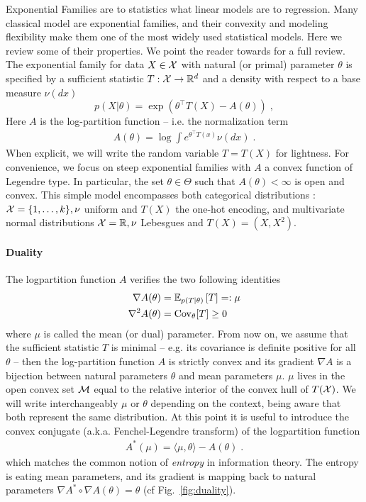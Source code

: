 \documentclass[twoside]{article}
\newcommand*{\expect}[2][]{\ensuremath{\mathbb{E}_{#1} \left[ #2 \right] }} %
\newcommand{\logpart}{A}
\newcommand{\conj}{\logpart^*}
\newcommand{\natp}{\theta}
\newcommand{\meanp}{\mu}
\begin{document}
Exponential Families are to statistics what linear models are to regression.
Many classical model are exponential families, and their convexity and modeling flexibility make them one of the most widely used statistical models. 
Here we review some of their properties. 
We point the reader towards \citet[Chapter 3]{wainwright2008graphical} for a full review.
The exponential family for data $X\in {\mathcal X}$ with natural (or primal) parameter $\natp$  is specified by a sufficient statistic $T: {\mathcal X} \rightarrow \mathbb{R}^d$ and a density with respect to a base measure $\nu(dx)$
\begin{equation}
	 p(X|\natp) = \exp( \natp^\top T(X) - \logpart(\natp)) \; ,
\end{equation}
Here $\logpart$ is the log-partition function -- i.e. the normalization term
\begin{align}
    \logpart(\natp) = \log \int e^{\natp^\top T(x)} \nu(dx) \; .
\end{align}
When explicit, we will write the random variable $T = T(X)$ for lightness.
For convenience, we focus on steep exponential families with $\logpart$ a convex function of Legendre type.
In particular, the set $\natp \in \Theta$ such that $\logpart(\natp) < \infty$ is open and convex.
This simple model encompasses both categorical distributions : ${\mathcal X} = \{1, \dots, k\}, \nu$ uniform and $T(X)$  the one-hot encoding, and multivariate normal distributions ${\mathcal X}=\mathbb{R}, \nu$ Lebesgues and $T(X)=(X, X^2)$. 


\paragraph{Duality}
The logpartition function $\logpart$ verifies the two following identities
\begin{align}
    \nabla\logpart(\natp) &=  \expect[p(T|\natp)]{T} =: \meanp \\
    \nabla^2 \logpart(\natp) &= \Cov_\natp[T] \geq 0
\end{align}
where $\meanp$ is called the mean (or dual) parameter.
From now on, we assume that the sufficient statistic $T$ is minimal 
-- e.g. its covariance is definite positive for all $\natp$ -- 
then the log-partition function $\logpart$ is strictly convex and its gradient $\nabla \logpart$ is a bijection between natural parameters $\natp$ and mean parameters $\mu$.
$\meanp$ lives in the open convex set ${\mathcal M}$ equal to the relative interior of the convex hull of $T({\mathcal X})$.
We will write interchangeably $\mu$ or  $\natp$ depending on the context, being aware that both represent the same distribution.
At this point it is useful to introduce the convex conjugate (a.k.a. Fenchel-Legendre transform) of the logpartition function
\begin{align}
	\conj(\mu) = \langle \mu, \natp \rangle - \logpart(\natp) \; .
\end{align}
which matches the common notion of \textit{entropy} in information theory.
The entropy is eating mean parameters, and its gradient is mapping back to natural parameters $\nabla\conj \circ \nabla\logpart(\natp) = \natp$ (cf Fig.~\ref{fig:duality}).
\end{document}
